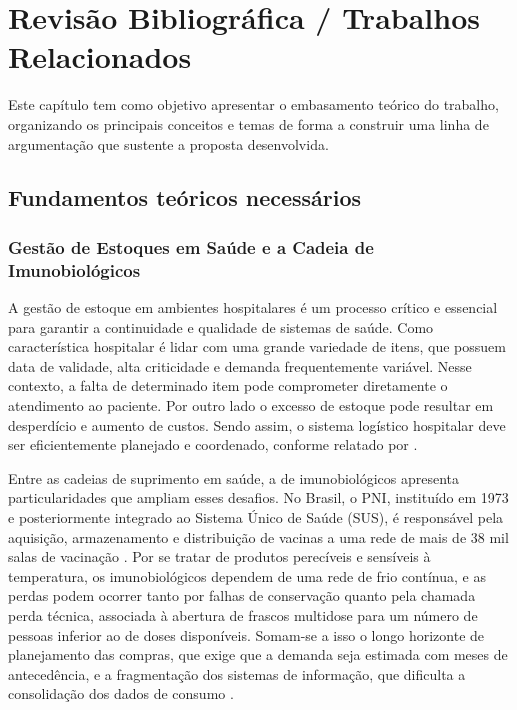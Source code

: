 \documentclass[
    12pt,
    openright,
    oneside,
    a4paper,
    english,
    brazil
]{abntex2}
\begin{document}
\chapter{Revisão Bibliográfica / Trabalhos Relacionados}
\label{cap:revisao}

Este capítulo tem como objetivo apresentar o embasamento teórico do trabalho, organizando os principais conceitos e temas de forma a construir uma linha de argumentação que sustente a proposta desenvolvida.

\section{Fundamentos teóricos necessários}
\label{sec:referencial}

\subsection{Gestão de Estoques em Saúde e a Cadeia de Imunobiológicos}
\label{subsec:gestao_estoques}

A gestão de estoque em ambientes hospitalares é um processo crítico e essencial para garantir a continuidade e qualidade de sistemas de saúde. Como característica hospitalar é lidar com uma grande variedade de itens, que possuem data de validade, alta criticidade e demanda frequentemente variável. Nesse contexto, a falta de determinado item pode comprometer diretamente o atendimento ao paciente. Por outro lado o excesso de estoque pode resultar em desperdício e aumento de custos. Sendo assim, o sistema logístico hospitalar deve ser eficientemente planejado e coordenado, conforme relatado por .

Entre as cadeias de suprimento em saúde, a de imunobiológicos apresenta particularidades que ampliam esses desafios. No Brasil, o PNI, instituído em 1973 e posteriormente integrado ao Sistema Único de Saúde (SUS), é responsável pela aquisição, armazenamento e distribuição de vacinas a uma rede de mais de 38 mil salas de vacinação \cite{Lopes2022}. Por se tratar de produtos perecíveis e sensíveis à temperatura, os imunobiológicos dependem de uma rede de frio contínua, e as perdas podem ocorrer tanto por falhas de conservação quanto pela chamada perda técnica, associada à abertura de frascos multidose para um número de pessoas inferior ao de doses disponíveis. Somam-se a isso o longo horizonte de planejamento das compras, que exige que a demanda seja estimada com meses de antecedência, e a fragmentação dos sistemas de informação, que dificulta a consolidação dos dados de consumo \cite{Lopes2022}.
\end{document}
